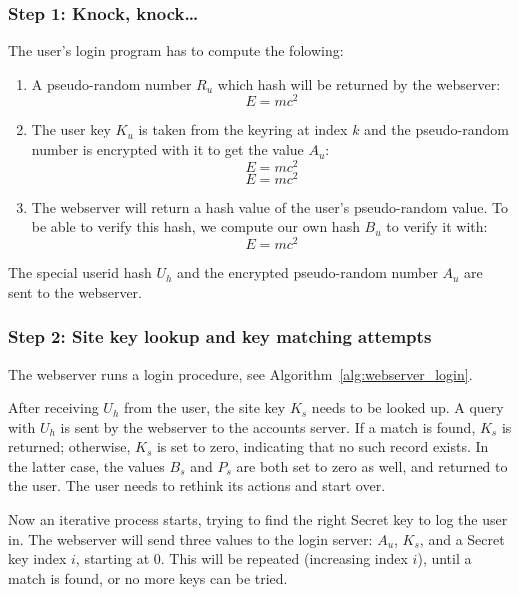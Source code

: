 \subsubsection{Step 1: Knock, knock\ldots}
\label{sec:login_step1}
The user's login program has to compute the folowing:
\begin{enumerate}
\item A pseudo-random number $R_u$ which hash will be returned by the webserver:
\[E=mc^2\]
\item The user key $K_u$ is taken from the keyring at index $k$ and the pseudo-random number is encrypted with it to get the value $A_u$:
\[E=mc^2\]
\[E=mc^2\]
\item The webserver will return a hash value of the user's pseudo-random value.
To be able to verify this hash,
we compute our own hash $B_u$ to verify it with:
\[E=mc^2\]
\end{enumerate}
The special userid hash $U_h$ and the encrypted pseudo-random number $A_u$ are sent to the webserver.

\subsubsection{Step 2: Site key lookup and key matching attempts}
\label{sec:login_step2}
The webserver runs a login procedure,
see Algorithm~\vref{alg:webserver_login}.
\par
After receiving $U_h$ from the user, the site key $K_s$ needs to be looked up.
A query with $U_h$ is sent by the webserver to the accounts server.
If a match is found, $K_s$ is returned;
otherwise, $K_s$ is set to zero, indicating that no such record exists.
In the latter case, the values $B_s$ and $P_s$ are both set to zero as well, and returned to the user.
The user needs to rethink its actions and start over.
\par
Now an iterative process starts, trying to find the right Secret key to log the user in.
The webserver will send three values to the login server:
$A_u$,
$K_s$,
and a Secret key index $i$,
starting at 0.
This will be repeated
(increasing index $i$),
until a match is found,
or no more keys can be tried.

